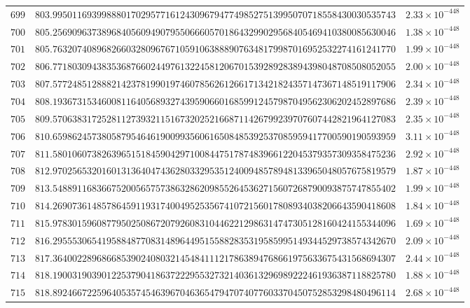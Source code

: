 \documentclass[12pt,reqno]{amsart}
\theoremstyle{remark}
\begin{document}
\begin{longtable}{clc}
$699$ & $803.9950116939988801702957716124309679477498527513995070718558430030535743$ & $2.33\times 10^{-448}$ \\
$700$ & $805.2569096373896840560949079550666057018643299029568405469410380085630046$ & $1.38\times 10^{-448}$ \\
$701$ & $805.7632074089682660328096767105910638889076348179987016952532274161241770$ & $1.99\times 10^{-448}$ \\
$702$ & $806.7718030943835368766024497613224581206701539289283894398048708508052055$ & $2.00\times 10^{-448}$ \\
$703$ & $807.5772485128882142378199019746078562612661713421824357147367148519117906$ & $2.34\times 10^{-448}$ \\
$704$ & $808.1936731534600811640568932743959066016859912457987049562306202452897686$ & $2.39\times 10^{-448}$ \\
$705$ & $809.5706383172528112739321151673202521668711426799239707607442821964127083$ & $2.35\times 10^{-448}$ \\
$706$ & $810.6598624573805879546461900993560616508485392537085959417700590190593959$ & $3.11\times 10^{-448}$ \\
$707$ & $811.5801060738263965151845904297100844751787483966122045379357309358475236$ & $2.92\times 10^{-448}$ \\
$708$ & $812.9702565320160131364047436280332953512400948578948133965048057675819579$ & $1.87\times 10^{-448}$ \\
$709$ & $813.5488911683667520056575738632862098552645362715607268790093875747855402$ & $1.99\times 10^{-448}$ \\
$710$ & $814.2690736148578645911931740049525356741072156017808934038206643590418608$ & $1.84\times 10^{-448}$ \\
$711$ & $815.9783015960877950250867207926083104462212986314747305128160424155344096$ & $1.69\times 10^{-448}$ \\
$712$ & $816.2955530654195884877083148964495155882835319585995149344529738574342670$ & $2.09\times 10^{-448}$ \\
$713$ & $817.3640022896866853902408032145484111217863894768661975633675431568694307$ & $2.44\times 10^{-448}$ \\
$714$ & $818.1900319039012253790418637222955327321403613296989222461936387118825780$ & $1.88\times 10^{-448}$ \\
$715$ & $818.8924667225964053574546396704636547947074077603370450752853298480496114$ & $2.68\times 10^{-448}$ \\

\end{longtable}
\end{document}
